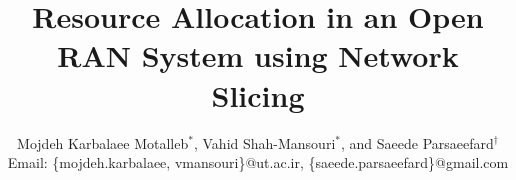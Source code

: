 \documentclass[lettersize,journal]{IEEEtran}
\begin{document}
\title{ Resource Allocation in an Open RAN System using Network Slicing\vspace{-.1cm}
}
\author{\small Mojdeh Karbalaee Motalleb$^*$, Vahid Shah-Mansouri$^*$, and Saeede Parsaeefard$^\dagger$ \\ Email: \{mojdeh.karbalaee, vmansouri\}@ut.ac.ir, \{saeede.parsaeefard\}@gmail.com\\
 }
\maketitle
{}
\end{document}
